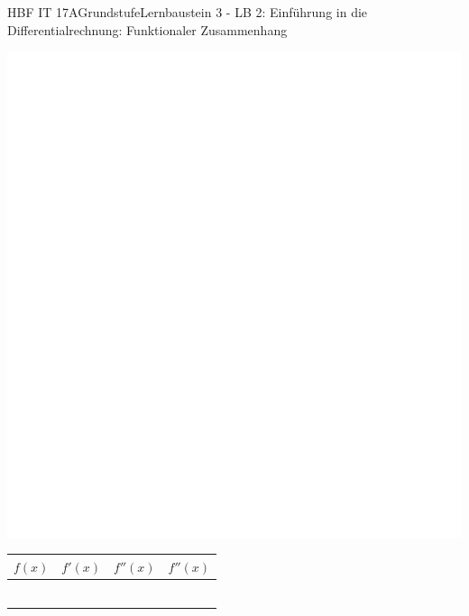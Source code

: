 \documentclass[oneside,openany,headings=optiontotoc,11pt,numbers=noenddot]{scrreprt}
\begin{document}
\begin{worksheet}{HBF IT 17A}{Grundstufe}{Lernbaustein 3 - LB 2: Einführung in die Differentialrechnung: Funktionaler Zusammenhang}
\begin{framed}
			\includegraphics[scale=0.1]{../empty.jpg}
			\begin{tabularx}{\textwidth}{|X|X|X|X|}
				\hline
				\multicolumn{1}{|c|}{\(f(x)\)} & \multicolumn{1}{c|}{\(f'(x)\)} & \multicolumn{1}{c|}{\(f''(x)\)} & \multicolumn{1}{c|}{\(f''(x)\)}\\
				\hline
				\hline
				\rule{0pt}{80pt}&&&\\
				\hline
				\rule{0pt}{80pt}&&&\\
				\hline
				\rule{0pt}{80pt}&&&\\
				\hline
				\rule{0pt}{80pt}&&&\\
				\hline
				\rule{0pt}{80pt}&&&\\
				\hline
				\rule{0pt}{80pt}&&&\\
				\hline			
			\end{tabularx}
		\end{framed}
	\end{worksheet}
\end{document}
